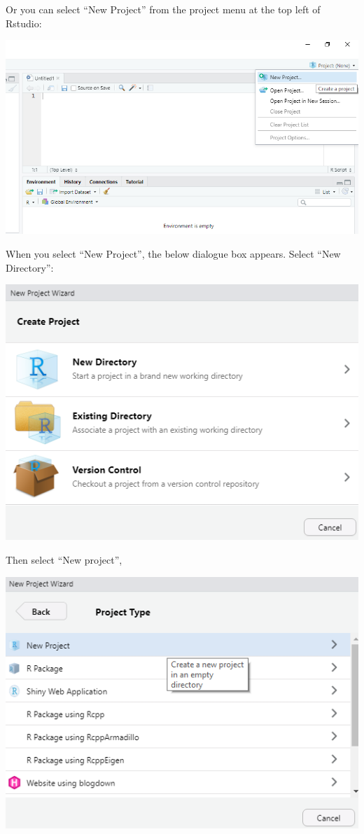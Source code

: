 \documentclass[
]{book}
\begin{document}
Or you can select ``New Project'' from the project menu at the top left of Rstudio:

\includegraphics[width=11.21in]{images/projectmenu}

When you select ``New Project'', the below dialogue box appears. Select ``New Directory'':

\includegraphics[width=7.26in]{images/projoption1}

Then select ``New project'',

\includegraphics[width=7.26in]{images/projoption2}
\end{document}
